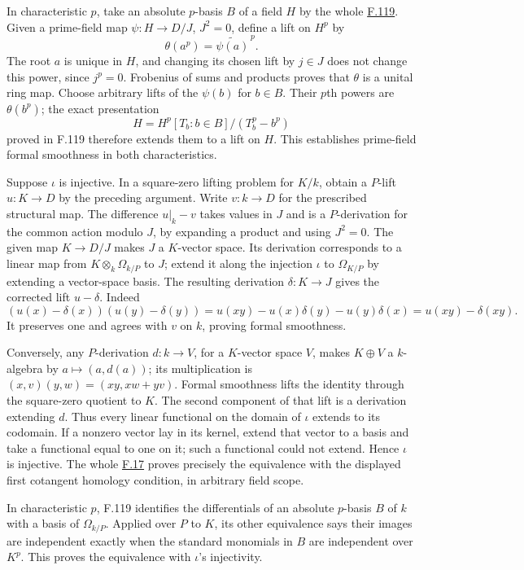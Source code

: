 \documentclass[11pt,a4paper,openany]{report}
\begin{document}
In characteristic \(p\), take an absolute \(p\)-basis \(B\) of a field \(H\) by the whole \hyperref[AG-RG-S05-more-algebra-lemma-p-basis]{F.119}. Given a prime-field map \(\psi:H\to D/J\), \(J^2=0\), define a lift on \(H^p\) by \[\theta(a^p)=\widetilde{\psi(a)}^{\,p}.\] The root \(a\) is unique in \(H\), and changing its chosen lift by \(j\in J\) does not change this power, since \(j^p=0\). Frobenius of sums and products proves that \(\theta\) is a unital ring map. Choose arbitrary lifts of the \(\psi(b)\) for \(b\in B\). Their \(p\)th powers are \(\theta(b^p)\); the exact presentation \[H=H^p[T_b:b\in B]/(T_b^p-b^p)\] proved in F.119 therefore extends them to a lift on \(H\). This establishes prime-field formal smoothness in both characteristics.

Suppose \(\iota\) is injective. In a square-zero lifting problem for \(K/k\), obtain a \(P\)-lift \(u:K\to D\) by the preceding argument. Write \(v:k\to D\) for the prescribed structural map. The difference \(u|_k-v\) takes values in \(J\) and is a \(P\)-derivation for the common action modulo \(J\), by expanding a product and using \(J^2=0\). The given map \(K\to D/J\) makes \(J\) a \(K\)-vector space. Its derivation corresponds to a linear map from \(K\otimes_k\Omega_{k/P}\) to \(J\); extend it along the injection \(\iota\) to \(\Omega_{K/P}\) by extending a vector-space basis. The resulting derivation \(\delta:K\to J\) gives the corrected lift \(u-\delta\). Indeed \[
(u(x)-\delta(x))(u(y)-\delta(y))
=u(xy)-u(x)\delta(y)-u(y)\delta(x)
=u(xy)-\delta(xy).
\] It preserves one and agrees with \(v\) on \(k\), proving formal smoothness.

Conversely, any \(P\)-derivation \(d:k\to V\), for a \(K\)-vector space \(V\), makes \(K\oplus V\) a \(k\)-algebra by \(a\mapsto(a,d(a))\); its multiplication is \((x,v)(y,w)=(xy,xw+yv)\). Formal smoothness lifts the identity through the square-zero quotient to \(K\). The second component of that lift is a derivation extending \(d\). Thus every linear functional on the domain of \(\iota\) extends to its codomain. If a nonzero vector lay in its kernel, extend that vector to a basis and take a functional equal to one on it; such a functional could not extend. Hence \(\iota\) is injective. The whole \hyperref[AG-RG-S05-algebra-lemma-characterize-formally-smooth-field-extension]{F.17} proves precisely the equivalence with the displayed first cotangent homology condition, in arbitrary field scope.

In characteristic \(p\), F.119 identifies the differentials of an absolute \(p\)-basis \(B\) of \(k\) with a basis of \(\Omega_{k/P}\). Applied over \(P\) to \(K\), its other equivalence says their images are independent exactly when the standard monomials in \(B\) are independent over \(K^p\). This proves the equivalence with \(\iota\)'s injectivity.
\end{document}

